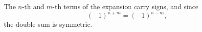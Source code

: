 \documentclass{article}
\begin{document}
The $n$-th and $m$-th terms of the expansion carry signs, and since
\begin{equation}
(-1)^{n+m} = (-1)^{n-m} ,
\label{eq:sign}
\end{equation}
the double sum is symmetric.
\end{document}
